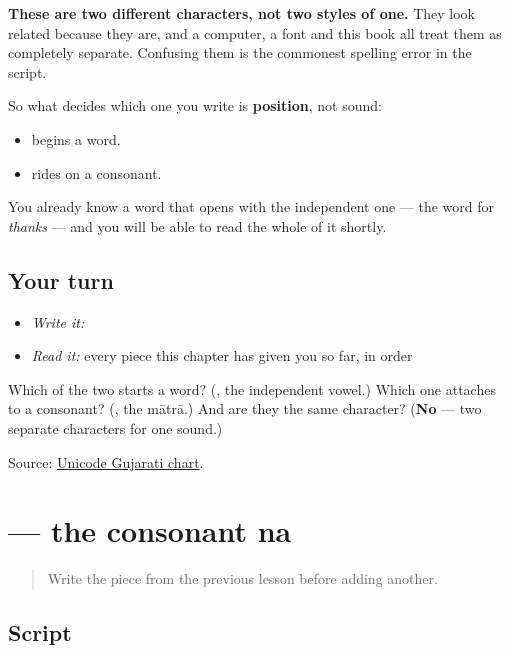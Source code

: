 \textbf{These are two different characters, not two styles of one.} They look related because they are, and a computer, a font and this book all treat them as completely separate. Confusing them is the commonest spelling error in the script.

So what decides which one you write is \textbf{position}, not sound:

\begin{itemize}
\raggedright
  \item \textbf{} begins a word.
  \item \textbf{} rides on a consonant.
\end{itemize}

You already know a word that opens with the independent one — the word for \emph{thanks} — and you will be able to read the whole of it shortly.

\subsection*{Your turn}
\begin{itemize}
\raggedright
  \item \emph{Write it:} 
  \item \emph{Read it:} every piece this chapter has given you so far, in order
\end{itemize}

\begin{tcolorbox}[breakable,colback=teal!4,colframe=teal!35!black,title={Before you move on}]
Which of the two starts a word? (\textbf{}, the independent vowel.) Which one attaches to a consonant? (\textbf{}, the mātrā.) And are they the same character? (\textbf{No} — two separate characters for one sound.)

Source: \href{https://www.unicode.org/charts/PDF/U0A80.pdf}{Unicode Gujarati chart}.
\end{tcolorbox}
\section[na]{ — the consonant na}

\label{lesson:GU-W01-na}



\begin{quote}
Write the piece from the previous lesson before adding another.
\end{quote}

\subsection*{Script}
\begin{quote}
\end{quote}

